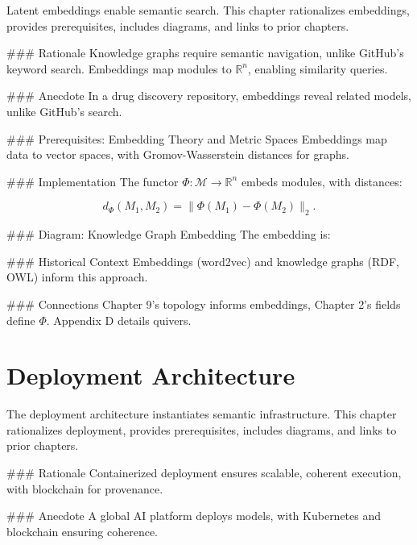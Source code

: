 \documentclass[12pt]{article}
\begin{document}
{Latent embeddings enable semantic search. This chapter rationalizes embeddings, provides prerequisites, includes diagrams, and links to prior chapters.

### Rationale
Knowledge graphs require semantic navigation, unlike GitHub’s keyword search. Embeddings map modules to $\mathbb{R}^n$, enabling similarity queries.

### Anecdote
In a drug discovery repository, embeddings reveal related models, unlike GitHub’s search.

### Prerequisites: Embedding Theory and Metric Spaces
Embeddings map data to vector spaces, with Gromov-Wasserstein distances for graphs.

### Implementation
The functor $\Phi : \mathcal{M} \to \mathbb{R}^n$ embeds modules, with distances:

\[
d_\Phi(M_1, M_2) = \|\Phi(M_1) - \Phi(M_2)\|_2.
\]

### Diagram: Knowledge Graph Embedding
The embedding is:

\begin{center}
\end{center}

### Historical Context
Embeddings (word2vec) and knowledge graphs (RDF, OWL) inform this approach.

### Connections
Chapter 9’s topology informs embeddings, Chapter 2’s fields define $\Phi$. Appendix D details quivers.

\section{Deployment Architecture}
\label{sec:chapter12}

The deployment architecture instantiates semantic infrastructure. This chapter rationalizes deployment, provides prerequisites, includes diagrams, and links to prior chapters.

### Rationale
Containerized deployment ensures scalable, coherent execution, with blockchain for provenance.

### Anecdote
A global AI platform deploys models, with Kubernetes and blockchain ensuring coherence.

}
\end{document}
